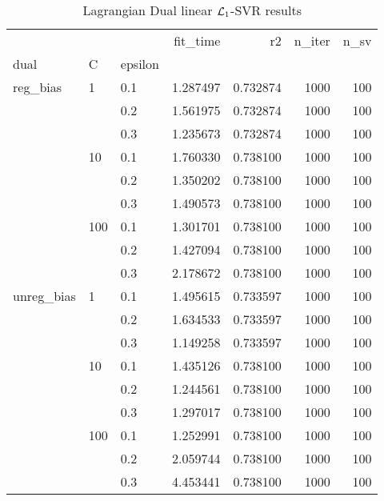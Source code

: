 \begin{table}[H]
\centering
\caption{Lagrangian Dual linear $\protect \mathcal{L}_1$-SVR results}
\label{linear_lagrangian_dual_l1_svr_cv_results}
\begin{tabular}{lllrrrr}
\toprule
           &     &     &  fit\_time &        r2 &  n\_iter &  n\_sv \\
dual & C & epsilon &           &           &         &       \\
\midrule
reg\_bias & 1   & 0.1 &  1.287497 &  0.732874 &    1000 &   100 \\
           &     & 0.2 &  1.561975 &  0.732874 &    1000 &   100 \\
           &     & 0.3 &  1.235673 &  0.732874 &    1000 &   100 \\
           & 10  & 0.1 &  1.760330 &  0.738100 &    1000 &   100 \\
           &     & 0.2 &  1.350202 &  0.738100 &    1000 &   100 \\
           &     & 0.3 &  1.490573 &  0.738100 &    1000 &   100 \\
           & 100 & 0.1 &  1.301701 &  0.738100 &    1000 &   100 \\
           &     & 0.2 &  1.427094 &  0.738100 &    1000 &   100 \\
           &     & 0.3 &  2.178672 &  0.738100 &    1000 &   100 \\
unreg\_bias & 1   & 0.1 &  1.495615 &  0.733597 &    1000 &   100 \\
           &     & 0.2 &  1.634533 &  0.733597 &    1000 &   100 \\
           &     & 0.3 &  1.149258 &  0.733597 &    1000 &   100 \\
           & 10  & 0.1 &  1.435126 &  0.738100 &    1000 &   100 \\
           &     & 0.2 &  1.244561 &  0.738100 &    1000 &   100 \\
           &     & 0.3 &  1.297017 &  0.738100 &    1000 &   100 \\
           & 100 & 0.1 &  1.252991 &  0.738100 &    1000 &   100 \\
           &     & 0.2 &  2.059744 &  0.738100 &    1000 &   100 \\
           &     & 0.3 &  4.453441 &  0.738100 &    1000 &   100 \\
\bottomrule
\end{tabular}
\end{table}
